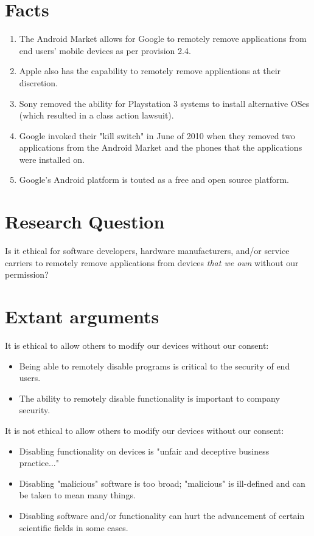 \documentclass[12pt]{article}
\begin{document}
\section{Facts}
\begin{enumerate}
\item The Android Market allows for Google to remotely remove applications from end users' mobile devices as per provision 2.4. \cite{AndroidMarketTOS}
\item Apple also has the capability to remotely remove applications at their discretion. \cite{iPhoneKill}
\item Sony removed the ability for Playstation 3 systems to install alternative OSes (which resulted in a class action lawsuit). \cite{sonyLawsuit}
\item Google invoked their "kill switch" in June of 2010 when they removed two applications from the Android Market and the phones that the applications were installed on. \cite{AndroidBlog}
\item Google's Android platform is touted as a free and open source platform. \cite{androidOpen}
\end{enumerate}

\section{Research Question}
Is it ethical for software developers, hardware manufacturers, and/or service carriers to remotely remove applications from devices \emph{that we own} without our permission?

\section{Extant arguments}
It is ethical to allow others to modify our devices without our consent:
\begin{itemize}
\item Being able to remotely disable programs is critical to the security of end users. \cite{AndroidBlog} \cite{iPhoneKill}
\item The ability to remotely disable functionality is important to company security. \cite{sonySupercomputer}
\end{itemize}
It is not ethical to allow others to modify our devices without our consent:
\begin{itemize}
\item Disabling functionality on devices is "unfair and deceptive business practice..." \cite{sonyLawsuit2}
\item Disabling "malicious" software is too broad; "malicious" is ill-defined and can be taken to mean many things. \cite{iPhoneKill}
\item Disabling software and/or functionality can hurt the advancement of certain scientific fields in some cases. \cite{sonySupercomputer}
\end{itemize}
\end{document}
